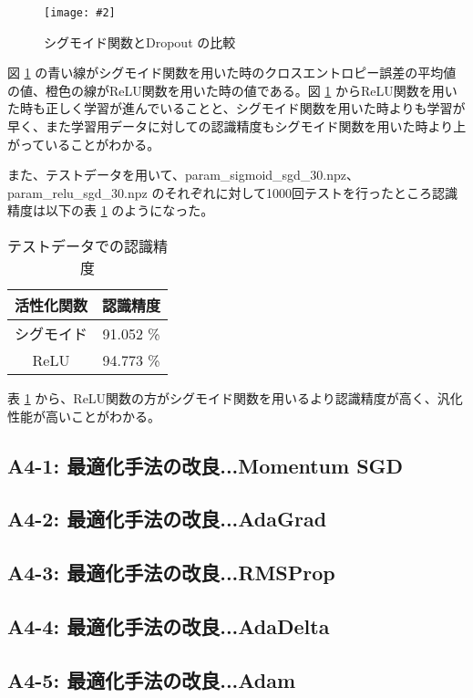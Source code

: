 \documentclass[a4paper,dvipdfmx]{jsarticle}
\newcommand{\image}[3]{
    \begin{figure}[H]
        \begin{center}
        \texttt{[image: \#2]}
        \end{center}
        \caption{#1}
        \label{#3}
    \end{figure}
}
\begin{document}
\image{シグモイド関数とDropout の比較}{report_a1-1.png}{fig-A-2-1}

図 \ref{fig-A-2-1} の青い線がシグモイド関数を用いた時のクロスエントロピー誤差の平均値の値、橙色の線がReLU関数を用いた時の値である。図 \ref{fig-A-2-1} からReLU関数を用いた時も正しく学習が進んでいることと、シグモイド関数を用いた時よりも学習が早く、また学習用データに対しての認識精度もシグモイド関数を用いた時より上がっていることがわかる。

また、テストデータを用いて、param\_sigmoid\_sgd\_30.npz、param\_relu\_sgd\_30.npz のそれぞれに対して1000回テストを行ったところ認識精度は以下の表 \ref{table-A1-1} のようになった。

\begin{table}[H]
\begin{center}
\caption{テストデータでの認識精度}
  \begin{tabular}{|c|c|} \hline
    活性化関数 & 認識精度  \\ \hline \hline
    シグモイド & 91.052 \%  \\ \hline
    ReLU & 94.773 \% \\ \hline
  \end{tabular}
	\label{table-A1-1}
\end{center}
\end{table}

表 \ref{table-A1-1} から、ReLU関数の方がシグモイド関数を用いるより認識精度が高く、汎化性能が高いことがわかる。
 
\subsection*{A4-1: 最適化手法の改良...Momentum SGD}


\subsection*{A4-2: 最適化手法の改良...AdaGrad}

\subsection*{A4-3: 最適化手法の改良...RMSProp}

\subsection*{A4-4: 最適化手法の改良...AdaDelta}

\subsection*{A4-5: 最適化手法の改良...Adam}
\end{document}
